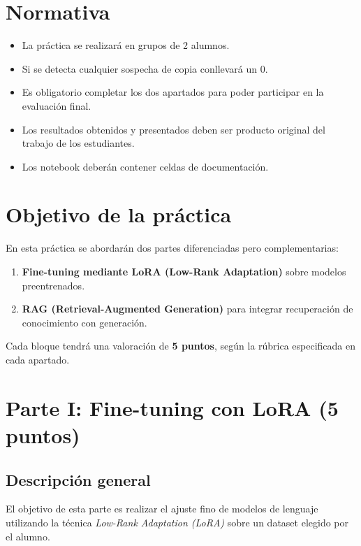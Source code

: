 \documentclass[a4paper]{article}
\begin{document}
\section*{Normativa}

\begin{itemize}
    \item La práctica se realizará en grupos de 2 alumnos.
    \item Si se detecta cualquier sospecha de copia conllevará un 0.
    \item Es obligatorio completar los dos apartados para poder participar en la evaluación final.
    \item Los resultados obtenidos y presentados deben ser producto original del trabajo de los estudiantes.
    \item Los notebook deberán contener celdas de documentación.
\end{itemize}

\section{Objetivo de la práctica}

En esta práctica se abordarán dos partes diferenciadas pero complementarias:
\begin{enumerate}
    \item \textbf{Fine-tuning mediante LoRA (Low-Rank Adaptation)} sobre modelos preentrenados.
    \item \textbf{RAG (Retrieval-Augmented Generation)} para integrar recuperación de conocimiento con generación.
\end{enumerate}

Cada bloque tendrá una valoración de \textbf{5 puntos}, según la rúbrica especificada en cada apartado.

\section{Parte I: Fine-tuning con LoRA (5 puntos)}

\subsection*{Descripción general}
El objetivo de esta parte es realizar el ajuste fino de modelos de lenguaje utilizando la técnica \textit{Low-Rank Adaptation (LoRA)} sobre un dataset elegido por el alumno.
\end{document}
